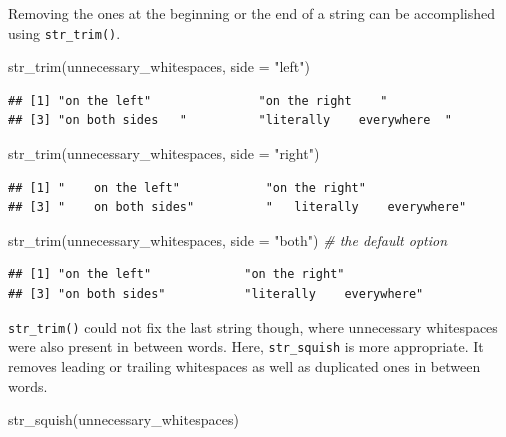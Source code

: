 \documentclass[
]{book}
\newenvironment{Shaded}{\begin{snugshade}}{\end{snugshade}}
\newcommand{\AttributeTok}[1]{\textcolor[rgb]{0.77,0.63,0.00}{#1}}
\newcommand{\CommentTok}[1]{\textcolor[rgb]{0.56,0.35,0.01}{\textit{#1}}}
\newcommand{\FunctionTok}[1]{\textcolor[rgb]{0.00,0.00,0.00}{#1}}
\newcommand{\NormalTok}[1]{#1}
\newcommand{\StringTok}[1]{\textcolor[rgb]{0.31,0.60,0.02}{#1}}
\begin{document}
Removing the ones at the beginning or the end of a string can be accomplished using \texttt{str\_trim()}.

\begin{Shaded}
\begin{Highlighting}[]
\FunctionTok{str\_trim}\NormalTok{(unnecessary\_whitespaces, }\AttributeTok{side =} \StringTok{"left"}\NormalTok{)}
\end{Highlighting}
\end{Shaded}

\begin{verbatim}
## [1] "on the left"               "on the right    "         
## [3] "on both sides   "          "literally    everywhere  "
\end{verbatim}

\begin{Shaded}
\begin{Highlighting}[]
\FunctionTok{str\_trim}\NormalTok{(unnecessary\_whitespaces, }\AttributeTok{side =} \StringTok{"right"}\NormalTok{)}
\end{Highlighting}
\end{Shaded}

\begin{verbatim}
## [1] "    on the left"            "on the right"              
## [3] "    on both sides"          "   literally    everywhere"
\end{verbatim}

\begin{Shaded}
\begin{Highlighting}[]
\FunctionTok{str\_trim}\NormalTok{(unnecessary\_whitespaces, }\AttributeTok{side =} \StringTok{"both"}\NormalTok{) }\CommentTok{\# the default option}
\end{Highlighting}
\end{Shaded}

\begin{verbatim}
## [1] "on the left"             "on the right"           
## [3] "on both sides"           "literally    everywhere"
\end{verbatim}

\texttt{str\_trim()} could not fix the last string though, where unnecessary whitespaces were also present in between words. Here, \texttt{str\_squish} is more appropriate. It removes leading or trailing whitespaces as well as duplicated ones in between words.

\begin{Shaded}
\begin{Highlighting}[]
\FunctionTok{str\_squish}\NormalTok{(unnecessary\_whitespaces)}
\end{Highlighting}
\end{Shaded}
\end{document}
